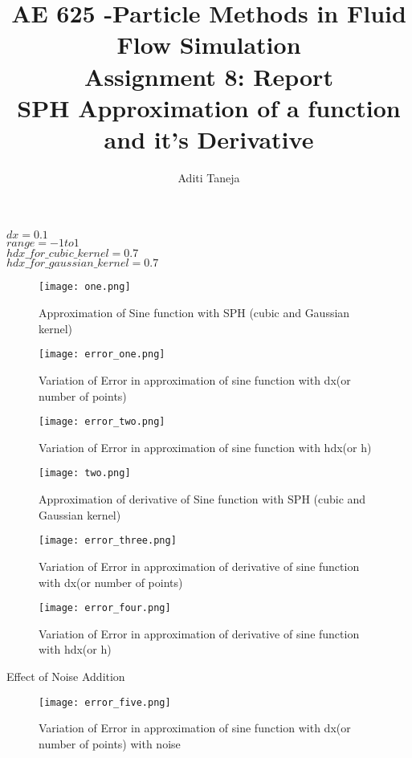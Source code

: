 \documentclass{article}
\title{AE 625 -Particle Methods in Fluid Flow Simulation \\ Assignment 8: Report \\ SPH Approximation of a function and it's Derivative}
\author{Aditi Taneja}
\date{}
\begin{document}
\maketitle

$dx =  0.1 $ 
\\
$range  = -1 to 1$
\\
$hdx\_for\_ cubic\_ kernel = 0.7$
\\
$hdx\_ for\_ gaussian\_ kernel = 0.7$


\begin{figure}[H]   \label{figure}
\texttt{[image: one.png]}
\caption{Approximation of Sine function with SPH (cubic and Gaussian kernel)}
\label{figure:}
\end{figure}

\begin{figure}[H] \label{figure}
\texttt{[image: error\_one.png]}
\caption{Variation of Error in approximation of sine function with dx(or number of points)}
\label{figure:}
\end{figure}

\begin{figure}[H] \label{figure}
\texttt{[image: error\_two.png]}
\caption{Variation of Error in approximation of sine function with hdx(or h)}
\label{figure:}
\end{figure}

\begin{figure}[H] \label{figure}
\texttt{[image: two.png]}
\caption{Approximation of derivative of Sine function with SPH (cubic and Gaussian kernel)}
\label{figure:}
\end{figure}

\begin{figure}[H] \label{figure}
\texttt{[image: error\_three.png]}
\caption{Variation of Error in approximation of derivative of sine function with dx(or number of points)}
\label{figure:}
\end{figure}

\begin{figure}[H] \label{figure}
\texttt{[image: error\_four.png]}
\caption{Variation of Error in approximation of derivative of sine function with hdx(or h)}
\label{figure:}
\end{figure}

Effect of Noise Addition

\begin{figure}[H] \label{figure}
\texttt{[image: error\_five.png]}
\caption{Variation of Error in approximation of sine function with dx(or number of points) with noise}
\label{figure:}
\end{figure}
\end{document}
